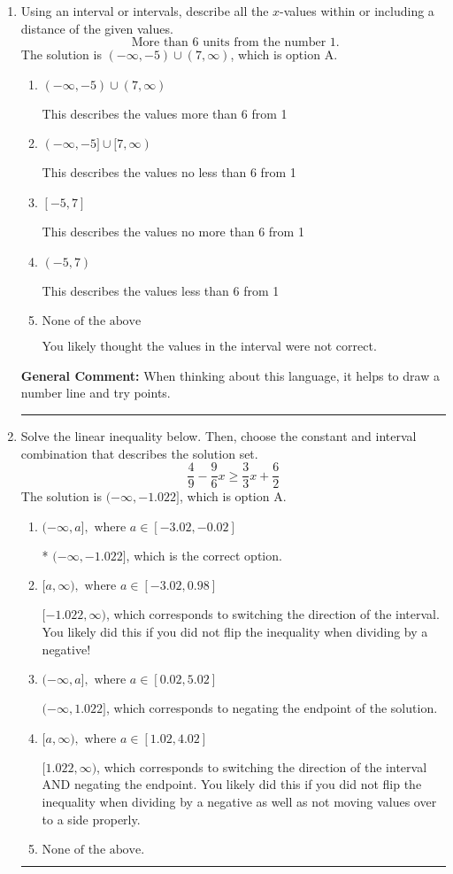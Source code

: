 \documentclass{extbook}[14pt]
\newcommand{\litem}[1]{\item #1

\rule{\textwidth}{0.4pt}}
\begin{document}
\begin{enumerate}\litem{
Using an interval or intervals, describe all the $x$-values within or including a distance of the given values.
\[ \text{ More than } 6 \text{ units from the number } 1. \]
The solution is \( (-\infty, -5) \cup (7, \infty) \), which is option A.\begin{enumerate}[label=\Alph*.]
\item \( (-\infty, -5) \cup (7, \infty) \)

This describes the values more than 6 from 1
\item \( (-\infty, -5] \cup [7, \infty) \)

This describes the values no less than 6 from 1
\item \( [-5, 7] \)

This describes the values no more than 6 from 1
\item \( (-5, 7) \)

This describes the values less than 6 from 1
\item \( \text{None of the above} \)

You likely thought the values in the interval were not correct.
\end{enumerate}

\textbf{General Comment:} When thinking about this language, it helps to draw a number line and try points.
}
\litem{
Solve the linear inequality below. Then, choose the constant and interval combination that describes the solution set.
\[ \frac{4}{9} - \frac{9}{6} x \geq \frac{3}{3} x + \frac{6}{2} \]
The solution is \( (-\infty, -1.022] \), which is option A.\begin{enumerate}[label=\Alph*.]
\item \( (-\infty, a], \text{ where } a \in [-3.02, -0.02] \)

* $(-\infty, -1.022]$, which is the correct option.
\item \( [a, \infty), \text{ where } a \in [-3.02, 0.98] \)

 $[-1.022, \infty)$, which corresponds to switching the direction of the interval. You likely did this if you did not flip the inequality when dividing by a negative!
\item \( (-\infty, a], \text{ where } a \in [0.02, 5.02] \)

 $(-\infty, 1.022]$, which corresponds to negating the endpoint of the solution.
\item \( [a, \infty), \text{ where } a \in [1.02, 4.02] \)

 $[1.022, \infty)$, which corresponds to switching the direction of the interval AND negating the endpoint. You likely did this if you did not flip the inequality when dividing by a negative as well as not moving values over to a side properly.
\item \( \text{None of the above}. \)


\end{enumerate}}
\end{enumerate}
\end{document}
